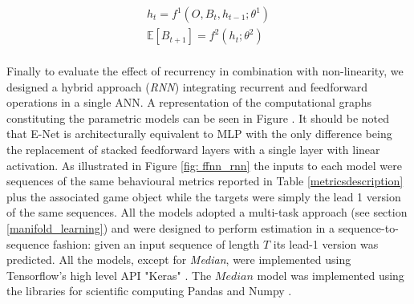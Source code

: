 \begin{gather}
\label{rnn_1_exp}
   h_t = f^1(O, B_{t}, h_{t-1}; \theta^1)  \\ \nonumber
   \mathbb{E}[B_{t+1}] = f^2(h_t; \theta^2) \\ \nonumber    
\end{gather}

Finally to evaluate the effect of recurrency in combination with non-linearity, we designed a hybrid approach (\textit{RNN}) integrating recurrent and feedforward operations in a single ANN. A representation of the computational graphs constituting the parametric models can be seen in Figure . It should be noted that E-Net is architecturally equivalent to MLP with the only difference being the replacement of stacked feedforward layers with a single layer with linear activation. As illustrated in Figure \ref{fig: ffnn_rnn} the inputs to each model were sequences of the same behavioural metrics reported in Table \ref{metricsdescription} plus the associated game object while the targets were simply the lead 1 version of the same sequences. All the models adopted a multi-task approach (see section \ref{manifold_learning}) and were designed to perform estimation in a sequence-to-sequence fashion: given an input sequence of length $T$ its lead-1 version was predicted. All the models, except for \textit{Median}, were implemented using Tensorflow's high level API "Keras" \cite{tensorflow2015-whitepaper,chollet2015keras}. The $Median$ model was implemented using the libraries for scientific computing Pandas and Numpy \cite{reback2020pandas,harris2020array}.


